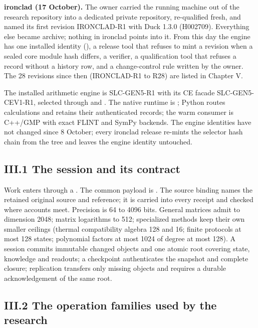 \textbf{ironclad (17 October).} The owner carried the running machine out of the research repository into a dedicated private repository,
re-qualified fresh, and named its first revision IRONCLAD-R1 with Duck 1.3.0 (H002709). Everything else became archive; nothing in ironclad
points into it. From this day the engine has one installed identity (), a release tool that refuses to mint a revision when a
sealed core module hash differs, a verifier, a qualification tool that refuses a record without a history row, and a change-control rule
written by the owner. The 28 revisions since then (IRONCLAD-R1 to R28) are listed in Chapter V.

\label{the-slc-today-slc-gen5-r1}

The installed arithmetic engine is SLC-GEN5-R1 with its CE facade SLC-GEN5-CEV1-R1, selected through  and
. The native runtime is ; Python routes calculations and retains their authenticated records; the warm
consumer is C++/GMP with exact FLINT and SymPy backends. The engine identities have not changed since 8 October; every ironclad release
re-mints the selector hash chain from the tree and leaves the engine identity untouched.

\subsection{III.1 The session and its contract}\label{iii.1-the-session-and-its-contract}

Work enters through a . The common payload is . The source
binding names the retained original source and reference; it is carried into every receipt and checked where accounts meet. Precision is
64 to 4096 bits. General matrices admit to dimension 2048; matrix logarithms to 512; specialized methods keep their own smaller ceilings
(thermal compatibility algebra 128 and 16; finite protocols at most 128 states; polynomial factors at most 1024 of degree at most 128). A
session commits immutable changed objects and one atomic root covering state, knowledge and readouts; a checkpoint authenticates the snapshot
and complete closure; replication transfers only missing objects and requires a durable acknowledgement of the same root.

\subsection{III.2 The operation families used by the research}\label{iii.2-the-operation-families-used-by-the-research}

